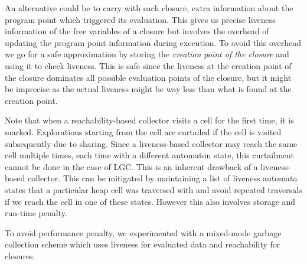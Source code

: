 \documentclass[9pt]{sigplanconf}
\begin{document}
An alternative could be to  carry with each closure, extra information
about the program point which triggered its evaluation.  This gives us
precise liveness  information of the  free variables of a  closure but
involves the overhead of updating the program point information during
execution.  To avoid  this overhead we go for a  safe approximation by
storing the {\em creation point of  the closure} and using it to check
liveness.  This  is safe since the  liveness at the creation  point of
the closure dominates  all possible evaluation points  of the closure,
but it  might be imprecise  as the actual  liveness might be  way less
than what is found at the creation point.

Note that  when a reachability-based  collector visits a cell  for the
first time,  it is  marked.  Explorations starting  from the  cell are
curtailed if the cell is visited subsequently due to sharing.  Since a
liveness-based collector may reach the  same cell multiple times, each
time with a different automaton state, this curtailment cannot be done
in the case  of LGC. This is an inherent  drawback of a liveness-based
collector.  This  can be mitigated  by maintaining a list  of liveness
automata states  that a  particular heap cell  was traversed  with and
avoid repeated traversals if we reach the cell in one of these states.
However this also involves storage and run-time penalty.

To  avoid  performance  penalty,  we experimented  with  a  mixed-mode
garbage collection scheme  which uses liveness for  evaluated data and
reachability for closures.
\end{document}
